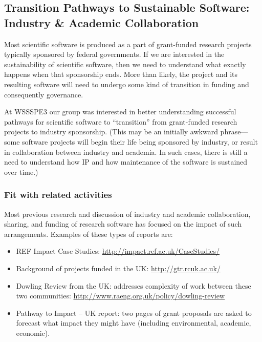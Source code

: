 
\subsection{Transition Pathways to Sustainable Software: Industry \& Academic Collaboration}
\label{sec:industry_interaction}


Most scientific software is produced as a part of grant-funded research projects
typically sponsored by federal governments. If we are interested in the
sustainability of scientific software, then we need to understand what exactly
happens when that sponsorship ends. More than likely, the project and its
resulting software will need to undergo some kind of transition in funding and
consequently governance.

At WSSSPE3 our group was interested in better understanding successful pathways
for scientific software to ``transition'' from grant-funded research projects to
industry sponsorship. (This may be an initially awkward phrase---some software
projects will begin their life being sponsored by industry, or result in
collaboration between industry and academia. In such cases, there is still a
need to understand how IP and how maintenance of the software is sustained over
time.)

\subsubsection{Fit with related activities}

Most previous research and discussion of industry and academic collaboration,
sharing, and funding of research software has focused on the impact of such
arrangements. Examples of these types of reports are:

\begin{itemize}
\item REF Impact Case Studies: \url{http://impact.ref.ac.uk/CaseStudies/}
\item Background of projects funded in the UK: \url{http://gtr.rcuk.ac.uk/}
\item Dowling Review from the UK: addresses complexity of work between these two
communities: \url{http://www.raeng.org.uk/policy/dowling-review}
\item Pathway to Impact -- UK report: two pages of grant proposals are asked to
forecast what impact they might have (including environmental, academic, economic).
\end{itemize}

